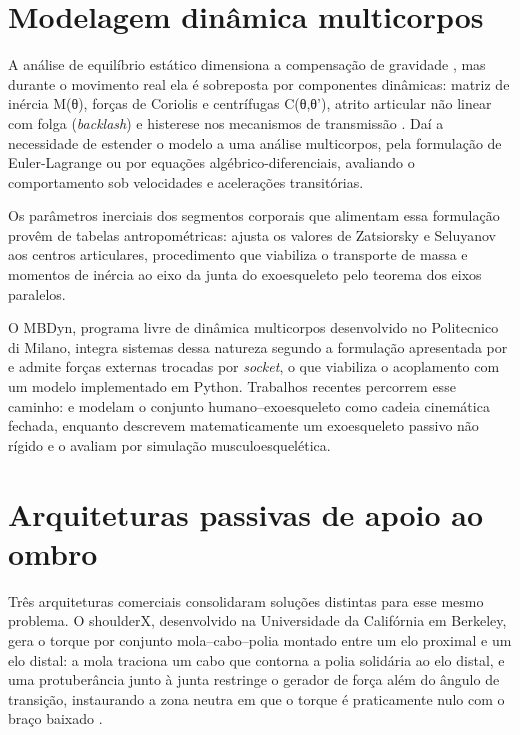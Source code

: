 \section{Modelagem dinâmica multicorpos}\label{sec:2.6}

A análise de equilíbrio estático dimensiona a compensação de gravidade \cite{palazzi2022}, mas durante o movimento real ela é sobreposta por componentes dinâmicas: matriz de inércia M(θ), forças de Coriolis e centrífugas C(θ,θ'), atrito articular não linear com folga (\textit{backlash}) e histerese nos mecanismos de transmissão \cite{rahman2015,wang2022}. Daí a necessidade de estender o modelo a uma análise multicorpos, pela formulação de Euler-Lagrange ou por equações algébrico-diferenciais, avaliando o comportamento sob velocidades e acelerações transitórias.

Os parâmetros inerciais dos segmentos corporais que alimentam essa formulação provêm de tabelas antropométricas: \textcite{deleva1996} ajusta os valores de Zatsiorsky e Seluyanov aos centros articulares, procedimento que viabiliza o transporte de massa e momentos de inércia ao eixo da junta do exoesqueleto pelo teorema dos eixos paralelos.

O MBDyn, programa livre de dinâmica multicorpos desenvolvido no Politecnico di Milano, integra sistemas dessa natureza segundo a formulação apresentada por \textcite{masarati2014} e admite forças externas trocadas por \textit{socket}, o que viabiliza o acoplamento com um modelo implementado em Python. Trabalhos recentes percorrem esse caminho: \textcite{nasr2022} e \textcite{nasr2023} modelam o conjunto humano–exoesqueleto como cadeia cinemática fechada, enquanto \textcite{musso2022} descrevem matematicamente um exoesqueleto passivo não rígido e o avaliam por simulação musculoesquelética.

\section{Arquiteturas passivas de apoio ao ombro}\label{sec:2.7}

Três arquiteturas comerciais consolidaram soluções distintas para esse mesmo problema. O shoulderX, desenvolvido na Universidade da Califórnia em Berkeley, gera o torque por conjunto mola–cabo–polia montado entre um elo proximal e um elo distal: a mola traciona um cabo que contorna a polia solidária ao elo distal, e uma protuberância junto à junta restringe o gerador de força além do ângulo de transição, instaurando a zona neutra em que o torque é praticamente nulo com o braço baixado \cite{vanengelhoven2018}.

